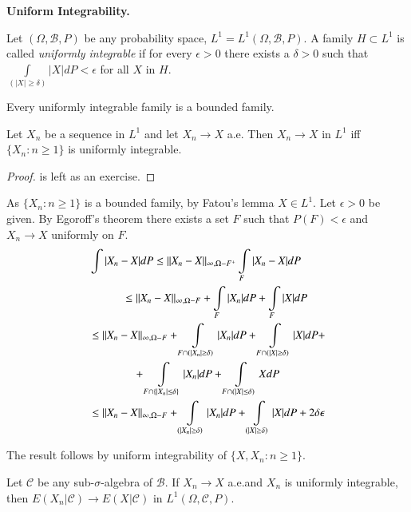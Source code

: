 \noindent
{\bf Uniform Integrability.}

\begin{defi*}
Let $(\Omega,\mathscr{B},P)$ be any probability space,
$L^{1}=L^{1}(\Omega,\mathscr{B},P)$. A family $H\subset L^{1}$ is
called {\em uniformly integrable} if for every $\epsilon>0$ there
exists a $\delta>0$ such that
$\int\limits_{(|X|\geq\delta)}|X|dP<\epsilon$ for all $X$ in $H$.
\end{defi*}

\begin{note*}
Every uniformly integrable family is a bounded family.
\end{note*}

\begin{prop*}
Let $X_{n}$ be a sequence in $L^{1}$ and let $X_{n}\to X$ a.e. Then
$X_{n}\to X$ in $L^{1}$ iff $\{X_{n}:n\geq 1\}$ is uniformly integrable.
\end{prop*}

\begin{proof}
is left as an exercise.
\end{proof}

As $\{X_{n}:n\geq 1\}$ is a bounded family, by Fatou's lemma $X\in
L^{1}$. Let $\epsilon>0$ be given. By Egoroff's theorem there exists a
set $F$ such that $P(F)<\epsilon$ and $X_{n}\to X$ uniformly on $F$.
\begin{align*}
& \int |X_{n}-X|dP \leq
  ||X_{n}-X||_{\infty,\Omega-F^{+}}\int\limits_{F}|X_{n}-X|dP\\ 
&\qquad\quad \leq
  ||X_{n}-X||_{\infty,\Omega-F}+\int\limits_{F}|X_{n}|dP+\int\limits_{F}|X|dP\\ 
&\leq ||X_{n}-X||_{\infty,\Omega-F}+\int\limits_{F\cap (|X_{n}|\geq
    \delta)}|X_{n}|dP+\int\limits_{F\cap (|X|\geq \delta)}|X|dP+\\
&\qquad\qquad +\int\limits_{F\cap \{|X_{n}|\leq
    \delta\}}|X_{n}|dP+\int\limits_{F\cap (|X|\leq \delta)}Xd P\\
&\leq ||X_{n}-X||_{\infty,\Omega-F}+\int\limits_{(|X_{n}|\geq
    \delta)}|X_{n}|dP+\int\limits_{(|X|\geq
    \delta)}|X|dP+2\delta\epsilon 
\end{align*}\pageoriginale

The result follows by uniform integrability of $\{X,X_{n}:n\geq 1\}$. 

\begin{coro*}
Let $\mathscr{C}$ be any sub-$\sigma$-algebra of $\mathscr{B}$. If
$X_{n}\to X$ a.e.\@ and $X_{n}$ is uniformly integrable, then
$E(X_{n}|\mathscr{C})\to E(X|\mathscr{C})$ in
$L^{1}(\Omega,\mathscr{C},P)$. 
\end{coro*}

